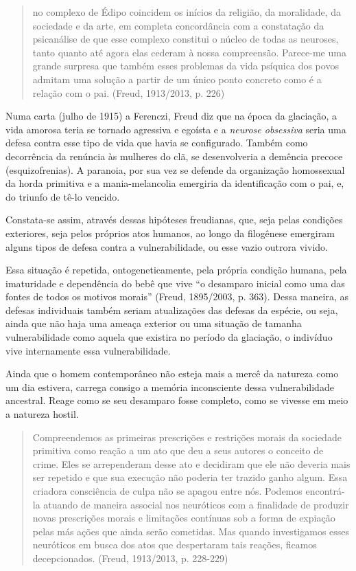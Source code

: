 \begin{quote}
no complexo de Édipo coincidem os inícios da religião, da moralidade, da
sociedade e da arte, em completa concordância com a constatação da
psicanálise de que esse complexo constitui o núcleo de todas as
neuroses, tanto quanto até agora elas cederam à nossa compreensão.
Parece-me uma grande surpresa que também esses problemas da vida
psíquica dos povos admitam uma solução a partir de um único ponto
concreto como é a relação com o pai. (Freud, 1913/2013, p. 226)
\end{quote}

Numa carta (julho de 1915) a Ferenczi, Freud diz que na época da
glaciação, a vida amorosa teria se tornado agressiva e egoísta e a
\emph{neurose obsessiva} seria uma defesa contra esse tipo de vida que
havia se configurado. Também como decorrência da renúncia às mulheres do
clã, se desenvolveria a demência precoce (esquizofrenias). A paranoia,
por sua vez se defende da organização homossexual da horda primitiva e a
mania-melancolia emergiria da identificação com o pai, e, do triunfo de
tê-lo vencido.

Constata-se assim, através dessas hipóteses freudianas, que, seja pelas
condições exteriores, seja pelos próprios atos humanos, ao longo da
filogênese emergiram alguns tipos de defesa contra a vulnerabilidade, ou
esse vazio outrora vivido.

Essa situação é repetida, ontogeneticamente, pela própria condição
humana, pela imaturidade e dependência do bebê que vive ``o desamparo
inicial como uma das fontes de todos os motivos morais'' (Freud,
1895/2003, p. 363). Dessa maneira, as defesas individuais também seriam
atualizações das defesas da espécie, ou seja, ainda que não haja uma
ameaça exterior ou uma situação de tamanha vulnerabilidade como aquela
que existira no período da glaciação, o indivíduo vive internamente essa
vulnerabilidade.

Ainda que o homem contemporâneo não esteja mais a mercê da natureza como
um dia estivera, carrega consigo a memória inconsciente dessa
vulnerabilidade ancestral. Reage como se seu desamparo fosse completo,
como se vivesse em meio a natureza hostil.

\begin{quote}
Compreendemos as primeiras prescrições e restrições morais da sociedade
primitiva como reação a um ato que deu a seus autores o conceito de
crime. Eles se arrependeram desse ato e decidiram que ele não deveria
mais ser repetido e que sua execução não poderia ter trazido ganho
algum. Essa criadora consciência de culpa não se apagou entre nós.
Podemos encontrá-la atuando de maneira associal nos neuróticos com a
finalidade de produzir novas prescrições morais e limitações contínuas
sob a forma de expiação pelas más ações que ainda serão cometidas. Mas
quando investigamos esses neuróticos em busca dos atos que despertaram
tais reações, ficamos decepcionados. (Freud, 1913/2013, p. 228-229)
\end{quote}

